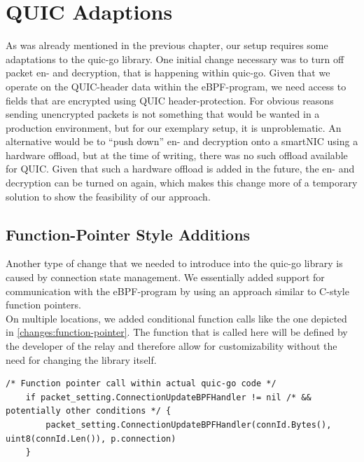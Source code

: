 \section{QUIC Adaptions}\label{sec:quic_adaptions}
As was already mentioned in the previous chapter, our setup requires some adaptations
to the quic-go library.
One initial change necessary was to turn off packet en- and decryption, 
that is happening within quic-go.
Given that we operate on the QUIC-header data within the eBPF-program, we need access 
to fields that are encrypted using QUIC header-protection.
For obvious reasons sending unencrypted packets is not something that would be wanted in 
a production environment, but for our exemplary setup, it is unproblematic. 
An alternative would be to ``push down'' en- and decryption onto a smartNIC using a 
hardware offload, but at the time of writing, there was no such offload available for QUIC\@. 
Given that such a hardware offload is added in the future, the en- and decryption can be
turned on again, which makes this change more of a temporary solution to show the feasibility
of our approach.

\subsection{Function-Pointer Style Additions}
Another type of change that we needed to introduce into the quic-go library is caused by 
connection state management.
We essentially added support for communication with the eBPF-program by using an 
approach similar to C-style function pointers.
\\
On multiple locations, we added conditional function calls like the one depicted in 
\autoref{changes:function-pointer}.
The function that is called here will be defined by the developer of the relay and 
therefore allow for customizability without the need for changing the library itself.

\vspace{0.5cm}
\noindent\begin{minipage}{\textwidth}
\begin{lstlisting}[style=GoStyle, label=changes:function-pointer, caption=An example of a function-pointer addition to the quic-go library.]
    /* Function pointer call within actual quic-go code */
    if packet_setting.ConnectionUpdateBPFHandler != nil /* && potentially other conditions */ {
	    packet_setting.ConnectionUpdateBPFHandler(connId.Bytes(), uint8(connId.Len()), p.connection)
	}
\end{lstlisting}
\end{minipage}

